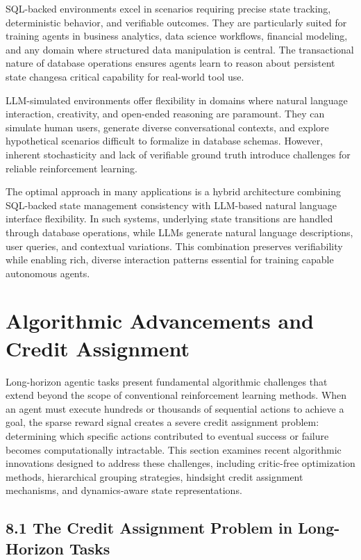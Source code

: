 SQL-backed environments excel in scenarios requiring precise state tracking, deterministic behavior, and verifiable outcomes. They are particularly suited for training agents in business analytics, data science workflows, financial modeling, and any domain where structured data manipulation is central. The transactional nature of database operations ensures agents learn to reason about persistent state changesa critical capability for real-world tool use.

LLM-simulated environments offer flexibility in domains where natural language interaction, creativity, and open-ended reasoning are paramount. They can simulate human users, generate diverse conversational contexts, and explore hypothetical scenarios difficult to formalize in database schemas. However, inherent stochasticity and lack of verifiable ground truth introduce challenges for reliable reinforcement learning.

The optimal approach in many applications is a hybrid architecture combining SQL-backed state management consistency with LLM-based natural language interface flexibility. In such systems, underlying state transitions are handled through database operations, while LLMs generate natural language descriptions, user queries, and contextual variations. This combination preserves verifiability while enabling rich, diverse interaction patterns essential for training capable autonomous agents.
\section{ Algorithmic Advancements and Credit Assignment}

Long-horizon agentic tasks present fundamental algorithmic challenges that extend beyond the scope of conventional reinforcement learning methods. When an agent must execute hundreds or thousands of sequential actions to achieve a goal, the sparse reward signal creates a severe credit assignment problem: determining which specific actions contributed to eventual success or failure becomes computationally intractable. This section examines recent algorithmic innovations designed to address these challenges, including critic-free optimization methods, hierarchical grouping strategies, hindsight credit assignment mechanisms, and dynamics-aware state representations.

\subsection{8.1 The Credit Assignment Problem in Long-Horizon Tasks}

